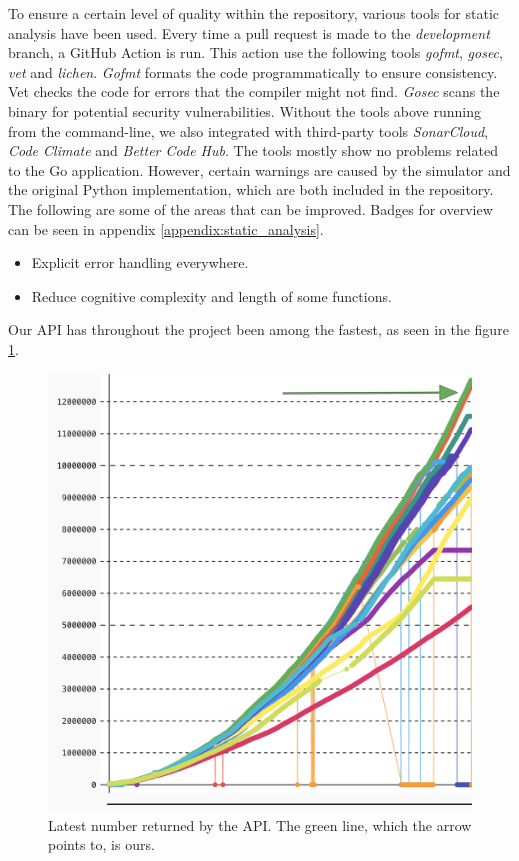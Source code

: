 \documentclass{article}
\begin{document}
To ensure a certain level of quality within the repository, various tools for static analysis have been used. Every time a pull request is made to the \textit{development} branch, a GitHub Action is run. This action use the following tools \textit{gofmt}, \textit{gosec}, \textit{vet} and \textit{lichen}.
\textit{Gofmt} formats the code programmatically to ensure consistency. Vet checks the code for errors that the compiler might not find. \textit{Gosec} scans the binary for potential security vulnerabilities. Without the tools above running from the command-line, we also integrated with third-party tools \textit{SonarCloud}, \textit{Code Climate} and \textit{Better Code Hub}. The tools mostly show no problems related to the Go application. 
However, certain warnings are caused by the simulator and the original Python implementation, which are both included in the repository. The following are some of the areas that can be improved. Badges for overview can be seen in appendix \ref{appendix:static_analysis}.

\begin{itemize}
    \item Explicit error handling everywhere.
    \item Reduce cognitive complexity and length of some functions.
\end{itemize}

\noindent Our API has throughout the project been among the fastest, as seen in the figure \ref{fig:latest-chart}.

\begin{figure}[H]
   \centering
   \includegraphics[width=\textwidth/2]{latest-chart.png}
   \caption{Latest number returned by the API. The green line, which the arrow points to, is ours.}
   \label{fig:latest-chart}
\end{figure}
\end{document}
